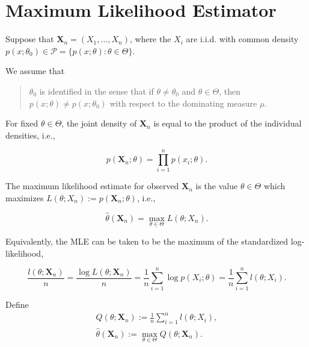 \chapter{Maximum Likelihood Estimator}

Suppose that $\textbf{X}_{n}=\left(X_{1},\ldots,X_{n}\right)$, where the $X_{i}$ are i.i.d. with common density $p\left(x;\theta_{0}\right)\in\mathcal{P}=\{p(x;\theta):\theta\in\Theta\}$.

We assume that

\begin{quotation}
    $\theta_{0}$ is identified in the sense that if $\theta\neq\theta_{0}$ and $\theta\in\Theta$, then $p(x;\theta)\neq p\left(x;\theta_{0}\right)$ with respect to the dominating measure $\mu$.
\end{quotation}

For fixed $\theta\in\Theta$, the joint density of $\textbf{X}_{n}$ is equal to the product of the individual densities, i.e.,

\begin{equation}
    p\left(\textbf{X}_{n};\theta\right)=\prod_{i=1}^{n} p\left(x_{i};\theta\right).
\end{equation}

The maximum likelihood estimate for observed $\textbf{X}_{n}$ is the value $\theta\in\Theta$ which maximizes $L\left(\theta;X_{n}\right):=p\left(\textbf{X}_{n};\theta\right)$, i.e.,

\begin{equation}
    \hat{\theta}\left(\textbf{X}_{n}\right)=\max_{\theta\in\Theta}L\left(\theta;X_{n}\right).
\end{equation}

Equivalently, the MLE can be taken to be the maximum of the standardized log-likelihood,

\begin{equation}
    \frac{l\left(\theta;\textbf{X}_{n}\right)}{n}=\frac{\log L\left(\theta;\textbf{X}_{n}\right)}{n}=\frac{1}{n}\sum_{i=1}^{n}\log p\left(X_{i};\theta\right)=\frac{1}{n}\sum_{i=1}^{n}l\left(\theta;X_{i}\right).
\end{equation}

Define
\begin{equation}
    \begin{gathered}
        Q\left(\theta;\textbf{X}_{n}\right):=\frac{1}{n}\sum_{i=1}^{n}l\left(\theta;X_{i}\right), \\
        \hat{\theta}\left(\textbf{X}_{n}\right):=\max_{\theta\in\Theta}Q\left(\theta;\textbf{X}_{n}\right). \\
    \end{gathered}
\end{equation}

